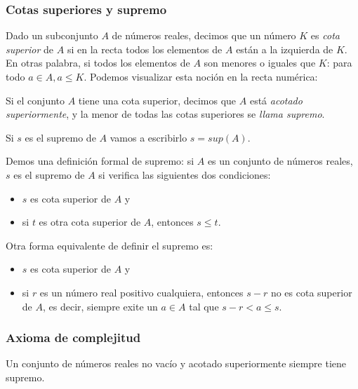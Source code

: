 \documentclass[../teoria.root.tex]{subfiles}
\begin{document}
\subsubsection{Cotas superiores y supremo}
Dado un subconjunto \(A\) de números reales, decimos que un número \(K\) es \textit{cota superior} de \(A\) si en la recta todos los elementos de \(A\) están a la izquierda de \(K\).
En otras palabra, si todos los elementos de \(A\) son menores o iguales que \(K\):
para todo \(a \in A, a \leq K\).
Podemos visualizar esta noción en la recta numérica:
\begin{center}
    \begin{scaletikzpicturetowidth}{0.5\linewidth}
    \end{scaletikzpicturetowidth}
\end{center}
Si el conjunto \(A\) tiene una cota superior, decimos que \(A\) está \textit{acotado superiormente}, y la menor de todas las cotas superiores se \textit{llama supremo}.

Si \(s\) es el supremo de \(A\) vamos a escribirlo \(s = sup(A)\).

Demos una definición formal de supremo:
si \(A\) es un conjunto de números reales, \(s\) es el supremo de \(A\) si verifica las siguientes dos condiciones:
\begin{itemize}
    \item \(s\) es cota superior de \(A\) y
    \item si \(t\) es otra cota superior de \(A\), entonces \(s \leq t\).
\end{itemize}
Otra forma equivalente de definir el supremo es:
\begin{itemize}
    \item \(s\) es cota superior de \(A\) y
    \item si \(r\) es un número real positivo cualquiera, entonces \(s - r\) no es cota superior de \(A\), es decir, siempre exite un \(a \in A\) tal que \(s - r < a \leq s\).
\end{itemize}
\subsubsection{Axioma de complejitud}
Un conjunto de números reales no vacío y acotado superiormente siempre tiene supremo.
\end{document}
